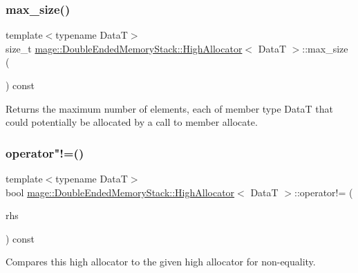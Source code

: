 \subsubsection{\texorpdfstring{max\+\_\+size()}{max\_size()}}
{\footnotesize\ttfamily template$<$typename DataT$>$ \\
size\+\_\+t \hyperlink{structmage_1_1_double_ended_memory_stack_1_1_high_allocator}{mage\+::\+Double\+Ended\+Memory\+Stack\+::\+High\+Allocator}$<$ DataT $>$\+::max\+\_\+size (\begin{DoxyParamCaption}{ }\end{DoxyParamCaption}) const\hspace{0.3cm}{\ttfamily [noexcept]}}

Returns the maximum number of elements, each of member type {\ttfamily DataT} that could potentially be allocated by a call to member allocate. \hypertarget{structmage_1_1_double_ended_memory_stack_1_1_high_allocator_a54019d2f65bcde7caf42dc507745e776}{}\label{structmage_1_1_double_ended_memory_stack_1_1_high_allocator_a54019d2f65bcde7caf42dc507745e776} 
\subsubsection{\texorpdfstring{operator"!=()}{operator!=()}}
{\footnotesize\ttfamily template$<$typename DataT$>$ \\
bool \hyperlink{structmage_1_1_double_ended_memory_stack_1_1_high_allocator}{mage\+::\+Double\+Ended\+Memory\+Stack\+::\+High\+Allocator}$<$ DataT $>$\+::operator!= (\begin{DoxyParamCaption}\item[{const \hyperlink{structmage_1_1_double_ended_memory_stack_1_1_high_allocator}{High\+Allocator}$<$ DataT $>$ \&}]{rhs }\end{DoxyParamCaption}) const\hspace{0.3cm}{\ttfamily [noexcept]}}

Compares this high allocator to the given high allocator for non-\/equality.


